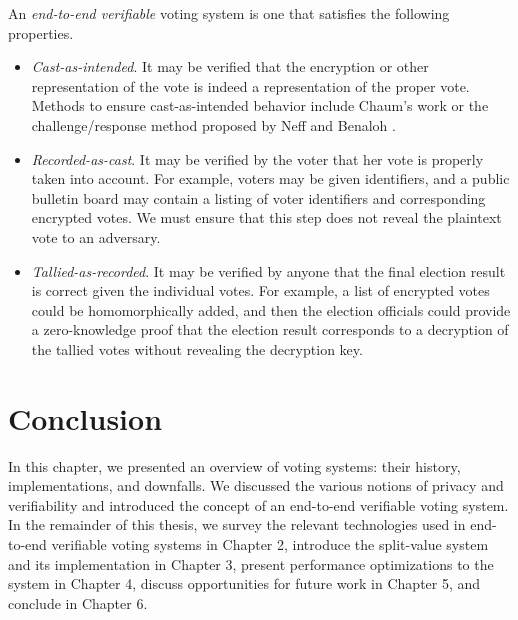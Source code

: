 \begin{definition} An \emph{end-to-end verifiable} voting system is one that satisfies the following properties.
\begin{itemize}
\item \emph{Cast-as-intended}. It may be verified that the encryption or other representation of the vote is indeed a representation of the proper vote. Methods to ensure cast-as-intended behavior include Chaum's work \cite{chaum04} or the challenge/response method proposed by Neff \cite{neff04} and Benaloh \cite{benaloh06}.
\item \emph{Recorded-as-cast}. It may be verified by the voter that her vote is properly taken into account. For example, voters may be given identifiers, and a public bulletin board may contain a listing of voter identifiers and corresponding encrypted votes. We must ensure that this step does not reveal the plaintext vote to an adversary.
\item \emph{Tallied-as-recorded}. It may be verified by anyone that the final election result is correct given the individual votes. For example, a list of encrypted votes could be homomorphically added, and then the election officials could provide a zero-knowledge proof that the election result corresponds to a decryption of the tallied votes without revealing the decryption key.
\end{itemize}
\end{definition}

\section{Conclusion} \label{intro:conclusion}

In this chapter, we presented an overview of voting systems: their history, implementations, and downfalls. We discussed the various notions of privacy and verifiability and introduced the concept of an end-to-end verifiable voting system. In the remainder of this thesis, we survey the relevant technologies used in end-to-end verifiable voting systems in Chapter 2, introduce the split-value system and its implementation in Chapter 3, present performance optimizations to the system in Chapter 4, discuss opportunities for future work in Chapter 5, and conclude in Chapter 6.
